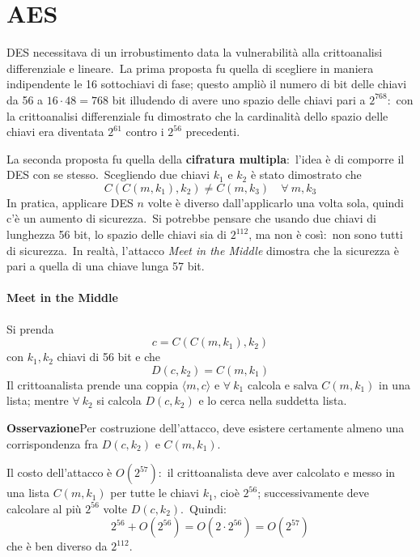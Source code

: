 \chapter{AES}

DES necessitava di un irrobustimento data la vulnerabilità alla crittoanalisi differenziale e lineare.\
La prima proposta fu quella di scegliere in maniera indipendente le 16 sottochiavi di fase; questo ampliò il numero di bit delle chiavi da 56 a $16\cdot 48 = 768$ bit illudendo di avere uno spazio delle chiavi pari a $2^{768}$:\ con la crittoanalisi differenziale fu dimostrato che la cardinalità dello spazio delle chiavi era diventata $2^{61}$ contro i $2^{56}$ precedenti.\

La seconda proposta fu quella della \textbf{cifratura multipla}:\ l'idea è di comporre il DES con se stesso.\
Scegliendo due chiavi $k_1$ e $k_2$ è stato dimostrato che \[C(C(m, k_1), k_2) \neq C(m,k_3)\quad \forall\ m,k_3\]
In pratica, applicare DES $n$ volte è diverso dall'applicarlo una volta sola, quindi c'è un aumento di sicurezza.\
Si potrebbe pensare che usando due chiavi di lunghezza 56 bit, lo spazio delle chiavi sia di $2^{112}$, ma non è così:\ non sono tutti di sicurezza.\
In realtà, l'attacco \textit{Meet in the Middle} dimostra che la sicurezza è pari a quella di una chiave lunga 57 bit.\

\subsubsection{Meet in the Middle}

Si prenda \[c = C(C(m,k_1), k_2)\] con $k_1, k_2$ chiavi di 56 bit e che \[D(c, k_2) = C (m, k_1)\]
Il crittoanalista prende una coppia $\langle m,c \rangle$ e $\forall\ k_1$ calcola e salva $C(m,k_1)$ in una lista; mentre $\forall\ k_2$ si calcola $D(c, k_2)$ e lo cerca nella suddetta lista.\

\vspace{12pt}
\noindent\textbf{Osservazione}\quad Per costruzione dell'attacco, deve esistere certamente almeno una corrispondenza fra $D(c,k_2)$ e $C(m,k_1)$.\
\vspace{12pt}

\noindent Il costo dell'attacco è $O(2^{57})$:\ il crittoanalista deve aver calcolato e messo in una lista $C(m,k_1)$ per tutte le chiavi $k_1$, cioè $2^{56}$; successivamente deve calcolare al più $2^{56}$ volte $D(c,k_2)$.\
Quindi:\
\[2^{56} + O(2^{56}) = O(2\cdot 2^{56}) = O(2^{57})\]
che è ben diverso da $2^{112}$.\

